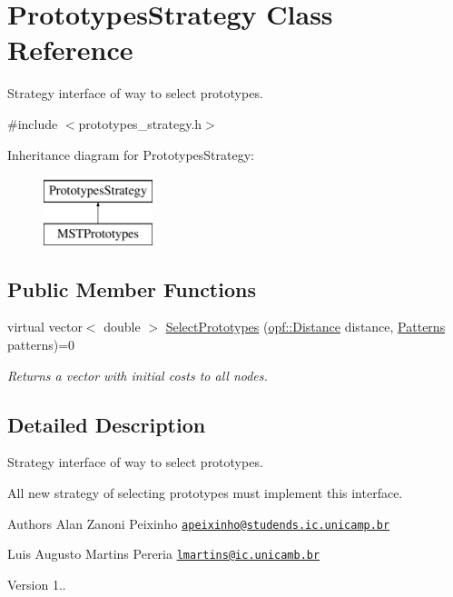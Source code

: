 \hypertarget{classPrototypesStrategy}{\section{Prototypes\+Strategy Class Reference}
\label{classPrototypesStrategy}
}


Strategy interface of way to select prototypes.  




{\ttfamily \#include $<$prototypes\+\_\+strategy.\+h$>$}

Inheritance diagram for Prototypes\+Strategy\+:\begin{figure}[H]
\begin{center}
\leavevmode
\includegraphics[height=2.000000cm]{classPrototypesStrategy}
\end{center}
\end{figure}
\subsection*{Public Member Functions}
\begin{DoxyCompactItemize}
\item 
virtual vector$<$ double $>$ \hyperlink{classPrototypesStrategy_a0422be14bb6be39a2d06112daf7043c1}{Select\+Prototypes} (\hyperlink{namespaceopf_a61631393754e0aa6aaeacf0767b2b419}{opf\+::\+Distance} distance, \hyperlink{classPatterns}{Patterns} patterns)=0
\begin{DoxyCompactList}\small\item\em Returns a vector with initial costs to all nodes. \end{DoxyCompactList}\end{DoxyCompactItemize}


\subsection{Detailed Description}
Strategy interface of way to select prototypes. 

All new strategy of selecting prototypes must implement this interface. \begin{DoxyAuthor}{Authors}
Alan Zanoni Peixinho \href{mailto:apeixinho@studends.ic.unicamp.br}{\tt apeixinho@studends.\+ic.\+unicamp.\+br} 

Luis Augusto Martins Pereria \href{mailto:lmartins@ic.unicamb.br}{\tt lmartins@ic.\+unicamb.\+br} 
\end{DoxyAuthor}
\begin{DoxyVersion}{Version}
1.. 
\end{DoxyVersion}


